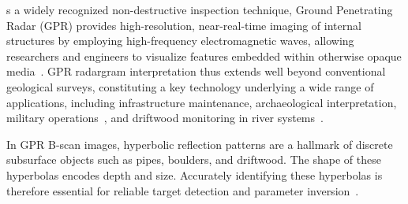 \documentclass[lettersize,journal]{IEEEtran}
\begin{document}
s a widely recognized non-destructive inspection technique,
Ground Penetrating Radar (GPR) provides high-resolution, near-real-time imaging
of internal structures by employing high-frequency electromagnetic waves,
allowing researchers and engineers to visualize features embedded within
otherwise opaque media~\cite{Benedetto2017An}. GPR radargram interpretation thus
extends well beyond conventional geological surveys, constituting a key
technology underlying a wide range of applications, including infrastructure
maintenance, archaeological interpretation, military operations~\cite{Bai2023A},
and driftwood monitoring in river systems~\cite{gomez}. 

In GPR B-scan images, hyperbolic reflection patterns are a hallmark of discrete
subsurface objects such as pipes, boulders, and driftwood. The shape of these
hyperbolas encodes depth and size. Accurately identifying these hyperbolas is
therefore essential for reliable target detection and parameter
inversion~\cite{Dou2016Real-Time}.

\end{document}
